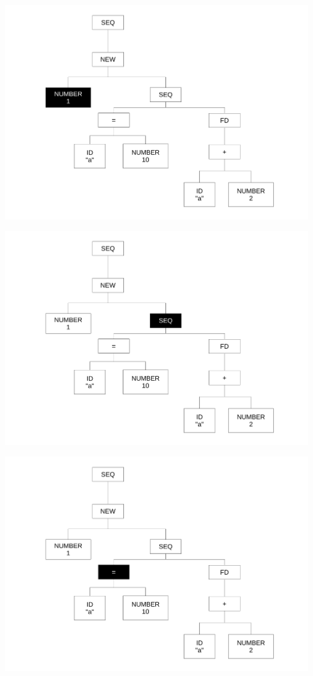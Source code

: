 \begin{frame}
\includegraphics[scale=0.3]{doc/Presentation/img/arbre3.pdf}
\end{frame}

\begin{frame}
\includegraphics[scale=0.3]{doc/Presentation/img/arbre4.pdf}
\end{frame}

\begin{frame}
\includegraphics[scale=0.3]{doc/Presentation/img/arbre5.pdf}
\end{frame}

